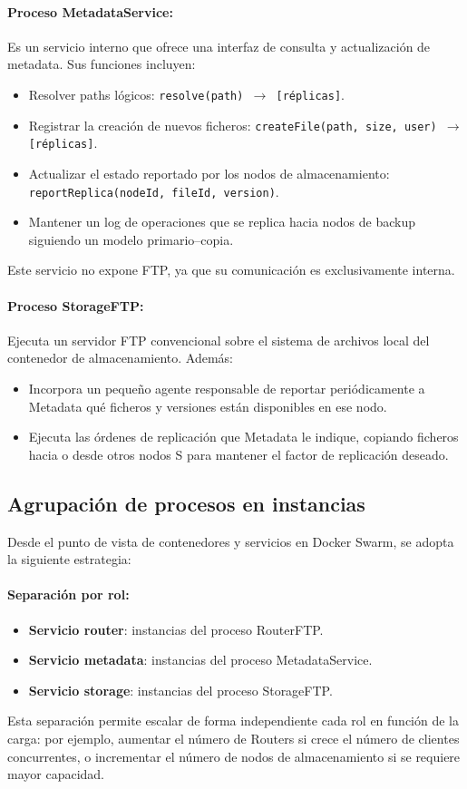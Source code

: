 \documentclass{article}
\begin{document}
\paragraph{Proceso MetadataService:}
Es un servicio interno que ofrece una interfaz de consulta y actualización de metadata. Sus funciones incluyen:
\begin{itemize}
    \item Resolver paths lógicos: \texttt{resolve(path) $\rightarrow$ [réplicas]}.
    \item Registrar la creación de nuevos ficheros: \texttt{createFile(path, size, user) $\rightarrow$ [réplicas]}.
    \item Actualizar el estado reportado por los nodos de almacenamiento: \texttt{reportReplica(nodeId, fileId, version)}.
    \item Mantener un log de operaciones que se replica hacia nodos de backup siguiendo un modelo primario–copia.
\end{itemize}
Este servicio no expone FTP, ya que su comunicación es exclusivamente interna.

\paragraph{Proceso StorageFTP:}
Ejecuta un servidor FTP convencional sobre el sistema de archivos local del contenedor de almacenamiento. Además:
\begin{itemize}
    \item Incorpora un pequeño agente responsable de reportar periódicamente a Metadata qué ficheros y versiones están disponibles en ese nodo.
    \item Ejecuta las órdenes de replicación que Metadata le indique, copiando ficheros hacia o desde otros nodos S para mantener el factor de replicación deseado.
\end{itemize}

\subsection{Agrupación de procesos en instancias}
Desde el punto de vista de contenedores y servicios en Docker Swarm, se adopta la siguiente estrategia:

\paragraph{Separación por rol:}
\begin{itemize}
    \item \textbf{Servicio router}: instancias del proceso RouterFTP.
    \item \textbf{Servicio metadata}: instancias del proceso MetadataService.
    \item \textbf{Servicio storage}: instancias del proceso StorageFTP.
\end{itemize}
Esta separación permite escalar de forma independiente cada rol en función de la carga: por ejemplo, aumentar el número de Routers si crece el número de clientes concurrentes, o incrementar el número de nodos de almacenamiento si se requiere mayor capacidad.
\end{document}

